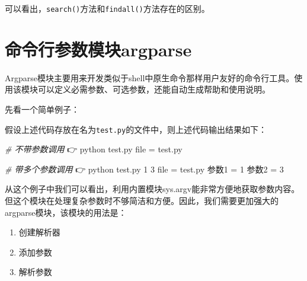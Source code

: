 \documentclass[]{ctexbook}
\newenvironment{Shaded}{\begin{snugshade}}{\end{snugshade}}
\newcommand{\BuiltInTok}[1]{#1}
\newcommand{\CommentTok}[1]{\textcolor[rgb]{0.56,0.35,0.01}{\textit{#1}}}
\newcommand{\ControlFlowTok}[1]{\textcolor[rgb]{0.13,0.29,0.53}{\textbf{#1}}}
\newcommand{\DecValTok}[1]{\textcolor[rgb]{0.00,0.00,0.81}{#1}}
\newcommand{\ExtensionTok}[1]{#1}
\newcommand{\FunctionTok}[1]{\textcolor[rgb]{0.00,0.00,0.00}{#1}}
\newcommand{\ImportTok}[1]{#1}
\newcommand{\KeywordTok}[1]{\textcolor[rgb]{0.13,0.29,0.53}{\textbf{#1}}}
\newcommand{\NormalTok}[1]{#1}
\newcommand{\OperatorTok}[1]{\textcolor[rgb]{0.81,0.36,0.00}{\textbf{#1}}}
\newcommand{\SpecialCharTok}[1]{\textcolor[rgb]{0.00,0.00,0.00}{#1}}
\newcommand{\StringTok}[1]{\textcolor[rgb]{0.31,0.60,0.02}{#1}}
\providecommand{\tightlist}{%
  \setlength{\itemsep}{0pt}\setlength{\parskip}{0pt}}
\begin{document}
可以看出，\texttt{search()}方法和\texttt{findall()}方法存在的区别。

\hypertarget{argparse}{%
\chapter{命令行参数模块argparse}\label{argparse}}

Argparse模块主要用来开发类似于shell中原生命令那样用户友好的命令行工具。使用该模块可以定义必需参数、可选参数，还能自动生成帮助和使用说明。

先看一个简单例子：

\begin{Shaded}
\end{Shaded}

假设上述代码存放在名为\texttt{test.py}的文件中，则上述代码输出结果如下：

\begin{Shaded}
\begin{Highlighting}[]
 \CommentTok{# 不带参数调用}
\NormalTok{👉  }\ExtensionTok{python}\NormalTok{ test.py}
\FunctionTok{file}\NormalTok{ =  test.py}

\CommentTok{# 带多个参数调用}
\NormalTok{👉  }\ExtensionTok{python}\NormalTok{ test.py 1 3}
\FunctionTok{file}\NormalTok{ =  test.py}
\NormalTok{参数}\ExtensionTok{1}\NormalTok{ = 1}
\NormalTok{参数}\ExtensionTok{2}\NormalTok{ = 3}
\end{Highlighting}
\end{Shaded}

从这个例子中我们可以看出，利用内置模块sys.argv能非常方便地获取参数内容。但这个模块在处理复杂参数时不够简洁和方便。因此，我们需要更加强大的argparse模块，该模块的用法是：

\begin{enumerate}
\def\labelenumi{\arabic{enumi}.}
\tightlist
\item
  创建解析器
\item
  添加参数
\item
  解析参数
\end{enumerate}
\end{document}
